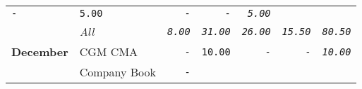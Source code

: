 \documentclass[11pt,A4paper,]{article}
\begin{document}
\begin{longtable}[]{@{}llrrrrr@{}}
\begin{minipage}[t]{0.14\columnwidth}
\texttt{-}\strut
\end{minipage} & \begin{minipage}[t]{0.14\columnwidth}\raggedleft\strut
\texttt{5.00}\strut
\end{minipage} & \begin{minipage}[t]{0.14\columnwidth}\raggedleft\strut
\texttt{-}\strut
\end{minipage} & \begin{minipage}[t]{0.14\columnwidth}\raggedleft\strut
\texttt{-}\strut
\end{minipage} & \begin{minipage}[t]{0.14\columnwidth}\raggedleft\strut
\emph{\texttt{5.00}}\strut
\end{minipage}\tabularnewline
\begin{minipage}[t]{0.14\columnwidth}\raggedright\strut
\strut
\end{minipage} & \begin{minipage}[t]{0.14\columnwidth}\raggedright\strut
\emph{All}\strut
\end{minipage} & \begin{minipage}[t]{0.14\columnwidth}\raggedleft\strut
\emph{\texttt{8.00}}\strut
\end{minipage} & \begin{minipage}[t]{0.14\columnwidth}\raggedleft\strut
\emph{\texttt{31.00}}\strut
\end{minipage} & \begin{minipage}[t]{0.14\columnwidth}\raggedleft\strut
\emph{\texttt{26.00}}\strut
\end{minipage} & \begin{minipage}[t]{0.14\columnwidth}\raggedleft\strut
\emph{\texttt{15.50}}\strut
\end{minipage} & \begin{minipage}[t]{0.14\columnwidth}\raggedleft\strut
\emph{\texttt{80.50}}\strut
\end{minipage}\tabularnewline
\textbf{December} & CGM CMA & \texttt{-} & \texttt{10.00} & \texttt{-} &
\texttt{-} & \emph{\texttt{10.00}}\tabularnewline
\begin{minipage}[t]{0.14\columnwidth}\raggedright\strut
\strut
\end{minipage} & \begin{minipage}[t]{0.14\columnwidth}\raggedright\strut
Company Book\strut
\end{minipage} & \begin{minipage}[t]{0.14\columnwidth}\raggedleft\strut
\texttt{-}\strut
\end{minipage} & \begin{minipage}[t]{0.14\columnwidth}\raggedleft\strut

\end{minipage}
\end{longtable}
\end{document}
